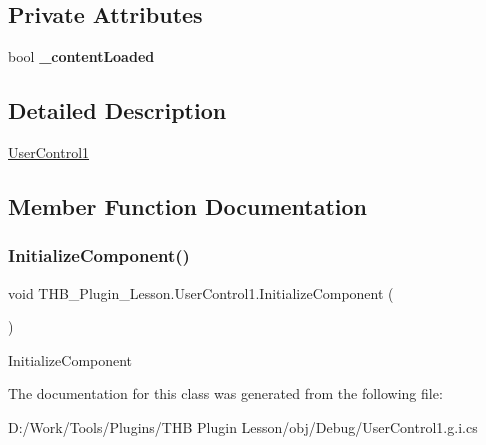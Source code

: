 \subsection*{Private Attributes}
\begin{DoxyCompactItemize}
\item 
\mbox{\label{class_t_h_b___plugin___lesson_1_1_user_control1_ad58ace768113ee37aa177bfbf97bf7cf}} 
bool {\bfseries \+\_\+content\+Loaded}
\end{DoxyCompactItemize}


\subsection{Detailed Description}
\mbox{\hyperlink{class_t_h_b___plugin___lesson_1_1_user_control1}{User\+Control1}} 



\subsection{Member Function Documentation}
\mbox{\label{class_t_h_b___plugin___lesson_1_1_user_control1_a6b157c1dad624766c5da2c984c9b1368}} 
\subsubsection{\texorpdfstring{Initialize\+Component()}{InitializeComponent()}}
{\footnotesize\ttfamily void T\+H\+B\+\_\+\+Plugin\+\_\+\+Lesson.\+User\+Control1.\+Initialize\+Component (\begin{DoxyParamCaption}{ }\end{DoxyParamCaption})}



Initialize\+Component 



The documentation for this class was generated from the following file\+:\begin{DoxyCompactItemize}
\item 
D\+:/\+Work/\+Tools/\+Plugins/\+T\+H\+B Plugin Lesson/obj/\+Debug/User\+Control1.\+g.\+i.\+cs\end{DoxyCompactItemize}
